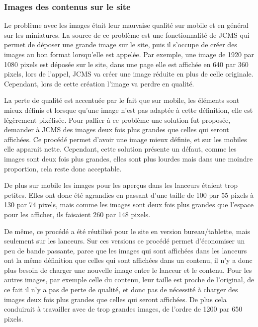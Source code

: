 \documentclass[12pt,a4paper]{article}
\begin{document}
\subsubsection{Images des contenus sur le site}
Le problème avec les images était leur mauvaise qualité sur mobile et en général sur les miniatures. La source de ce problème est une fonctionnalité de \gls{JCMS} qui permet de déposer une grande image sur le site, puis il s'occupe de créer des images au bon format lorsqu'elle est appelée. Par exemple, une image de 1920 par 1080 pixels est déposée sur le site, dans une page elle est affichée en 640 par 360 pixels, lors de l'appel, \gls{JCMS} va créer une image réduite en plus de celle originale. Cependant, lors de cette création l'image va perdre en qualité.\par
\medskip
La perte de qualité est accentuée par le fait que sur mobile, les éléments sont mieux définis et lorsque qu'une image n'est pas adaptée à cette définition, elle est légèrement pixélisée. Pour pallier à ce problème une solution fut proposée, demander à \gls{JCMS} des images deux fois plus grandes que celles qui seront affichées. Ce procédé permet d'avoir une image mieux définie, et sur les mobiles elle apparait nette. Cependant, cette solution présente un défaut, comme les images sont deux fois plus grandes, elles sont plus lourdes mais dans une moindre proportion, cela reste donc acceptable.\par
De plus sur mobile les images pour les aperçus dans les lanceurs étaient trop petites. Elles ont donc été agrandies en passant d'une taille de 100 par 55 pixels à 130 par 74 pixels, mais comme les images sont deux fois plus grandes que l'espace pour les afficher, ils faisaient 260 par 148 pixels.\par 
De même, ce procédé a été réutilisé pour le site en version bureau/tablette, mais seulement sur les lanceurs. Sur ces versions ce procédé permet d'économiser un peu de bande passante, parce que les images qui sont affichées dans les lanceurs ont la même définition que celles qui sont affichées dans un contenu, il n'y a donc plus besoin de charger une nouvelle image entre le lanceur et le contenu. Pour les autres images, par exemple celle du contenu, leur taille est proche de l'original, de ce fait il n'y a pas de perte de qualité, et donc pas de nécessité à charger des images deux fois plus grandes que celles qui seront affichées. De plus cela conduirait à travailler avec de trop grandes images, de l'ordre de 1200 par 650 pixels.\par
\end{document}
